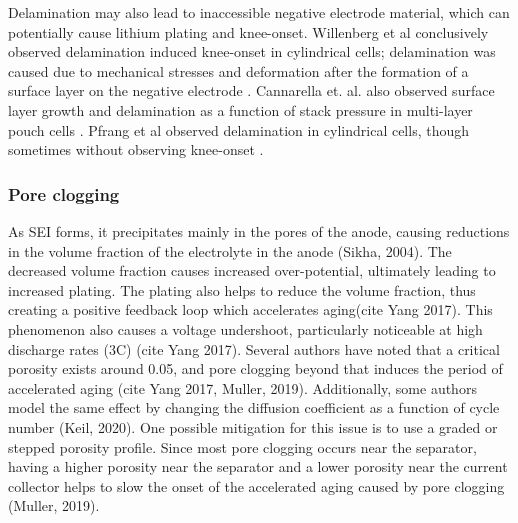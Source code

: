 \documentclass{article}
\begin{document}
Delamination may also lead to inaccessible negative electrode material, which can potentially cause lithium plating and knee-onset. Willenberg et al conclusively observed delamination induced knee-onset in cylindrical cells; delamination was caused due to mechanical stresses and deformation after the formation of a surface layer on the negative electrode \cite{willenberg_high-precision_2020}. Cannarella et. al. also observed surface layer growth and delamination as a function of stack pressure in multi-layer pouch cells \cite{cannarella_stress_2014}. Pfrang et al observed delamination in cylindrical cells, though sometimes without observing knee-onset \cite{pfrang_long-term_2018}.

\subsubsection{Pore clogging}
As SEI forms, it precipitates mainly in the pores of the anode, causing reductions in the volume fraction of the electrolyte in the anode (Sikha, 2004). The decreased volume fraction causes increased over-potential, ultimately leading to increased plating. The plating also helps to reduce the volume fraction, thus creating a positive feedback loop which accelerates aging(cite Yang 2017). This phenomenon also causes a voltage undershoot, particularly noticeable at high discharge rates (3C) (cite Yang 2017). Several authors have noted that a critical porosity exists around 0.05, and pore clogging beyond that induces the period of accelerated aging (cite Yang 2017, Muller, 2019). Additionally, some authors model the same effect by changing the diffusion coefficient as a function of cycle number (Keil, 2020). One possible mitigation for this issue is to use a graded or stepped porosity profile. Since most pore clogging occurs near the separator, having a higher porosity near the separator and a lower porosity near the current collector helps to slow the onset of the accelerated aging caused by pore clogging (Muller, 2019).
\end{document}
